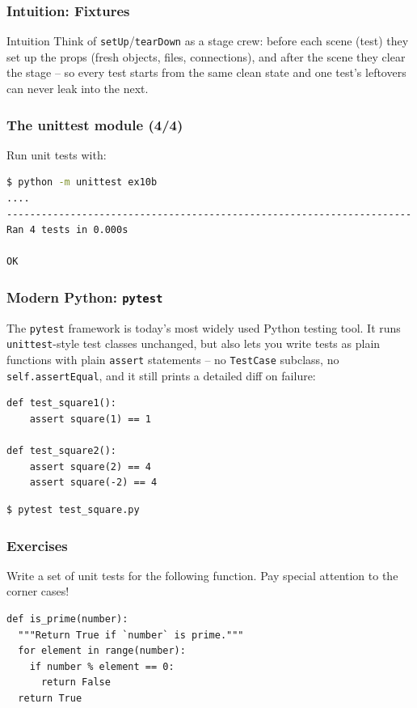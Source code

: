 \begin{frame}[fragile]\frametitle{Intuition: Fixtures}
\begin{block}{Intuition}
Think of \texttt{setUp}/\texttt{tearDown} as a stage crew: before each scene (test) they set up
the props (fresh objects, files, connections), and after the scene they clear the stage --
so every test starts from the same clean state and one test's leftovers can never leak into
the next.
\end{block}
\end{frame}


\begin{frame}[fragile]
\frametitle{The unittest module (4/4)}
Run unit tests with:
  \begin{lstlisting}[language=sh]
$ python -m unittest ex10b
....
----------------------------------------------------------------------
Ran 4 tests in 0.000s

OK
\end{lstlisting}
\end{frame}

\begin{frame}[fragile]\frametitle{Modern Python: \texttt{pytest}}
The \texttt{pytest} framework is today's most widely used Python testing tool. It runs
\texttt{unittest}-style test classes unchanged, but also lets you write tests as plain
functions with plain \texttt{assert} statements -- no \texttt{TestCase} subclass, no
\texttt{self.assertEqual}, and it still prints a detailed diff on failure:
\begin{lstlisting}
def test_square1():
    assert square(1) == 1

def test_square2():
    assert square(2) == 4
    assert square(-2) == 4
\end{lstlisting}
\begin{lstlisting}[language=sh]
$ pytest test_square.py
\end{lstlisting}
\end{frame}

\begin{frame}[fragile]\frametitle{Exercises}
    Write a set of unit tests for the following function. Pay special attention to the corner
    cases!
\begin{lstlisting}
def is_prime(number):
  """Return True if `number` is prime."""
  for element in range(number):
    if number % element == 0:
      return False
  return True
\end{lstlisting}
\end{frame}

